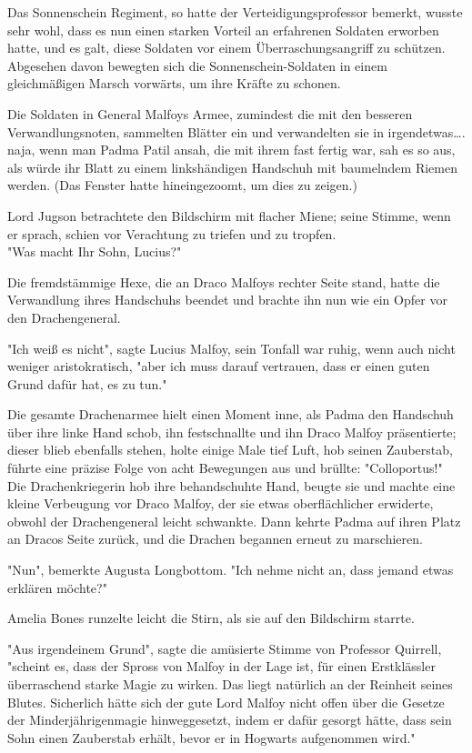 {Das Sonnenschein Regiment, so hatte der Verteidigungsprofessor bemerkt, wusste sehr wohl, dass es nun einen starken Vorteil an erfahrenen Soldaten erworben hatte, und es galt, diese Soldaten vor einem Überraschungsangriff zu schützen. Abgesehen davon bewegten sich die Sonnenschein-Soldaten in einem gleichmäßigen Marsch vorwärts, um ihre Kräfte zu schonen.

Die Soldaten in General Malfoys Armee, zumindest die mit den besseren Verwandlungsnoten, sammelten Blätter ein und verwandelten sie in irgendetwas…. naja, wenn man Padma Patil ansah, die mit ihrem fast fertig war, sah es so aus, als würde ihr Blatt zu einem linkshändigen Handschuh mit baumelndem Riemen werden. (Das Fenster hatte hineingezoomt, um dies zu zeigen.)

Lord Jugson betrachtete den Bildschirm mit flacher Miene; seine Stimme, wenn er sprach, schien vor Verachtung zu triefen und zu tropfen.\\ "Was macht Ihr Sohn, Lucius?"

Die fremdstämmige Hexe, die an Draco Malfoys rechter Seite stand, hatte die Verwandlung ihres Handschuhs beendet und brachte ihn nun wie ein Opfer vor den Drachengeneral.

"Ich weiß es nicht", sagte Lucius Malfoy, sein Tonfall war ruhig, wenn auch nicht weniger aristokratisch, "aber ich muss darauf vertrauen, dass er einen guten Grund dafür hat, es zu tun."

Die gesamte Drachenarmee hielt einen Moment inne, als Padma den Handschuh über ihre linke Hand schob, ihn festschnallte und ihn Draco Malfoy präsentierte; dieser blieb ebenfalls stehen, holte einige Male tief Luft, hob seinen Zauberstab, führte eine präzise Folge von acht Bewegungen aus und brüllte: "Colloportus!"\\ Die Drachenkriegerin hob ihre behandschuhte Hand, beugte sie und machte eine kleine Verbeugung vor Draco Malfoy, der sie etwas oberflächlicher erwiderte, obwohl der Drachengeneral leicht schwankte. Dann kehrte Padma auf ihren Platz an Dracos Seite zurück, und die Drachen begannen erneut zu marschieren.

"Nun", bemerkte Augusta Longbottom. "Ich nehme nicht an, dass jemand etwas erklären möchte?"

Amelia Bones runzelte leicht die Stirn, als sie auf den Bildschirm starrte.

"Aus irgendeinem Grund", sagte die amüsierte Stimme von Professor Quirrell, "scheint es, dass der Spross von Malfoy in der Lage ist, für einen Erstklässler überraschend starke Magie zu wirken. Das liegt natürlich an der Reinheit seines Blutes. Sicherlich hätte sich der gute Lord Malfoy nicht offen über die Gesetze der Minderjährigenmagie hinweggesetzt, indem er dafür gesorgt hätte, dass sein Sohn einen Zauberstab erhält, bevor er in Hogwarts aufgenommen wird."

}
